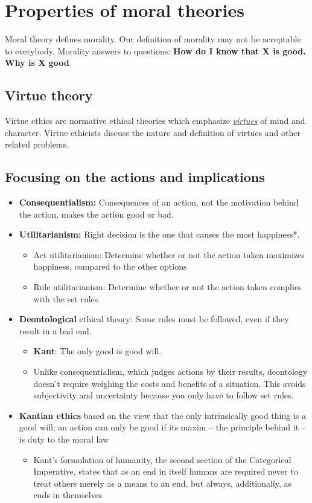 \documentclass{article}
\newcommand{\worddef}[1]{\hyperref[sec:reference]{\textit{#1}}}
\begin{document}
\section{Properties of moral theories}

\begin{flushleft}
Moral theory defines morality. Our definition of morality may not be acceptable to everybody.
Morality answers to questions: \textbf{How do I know that X is good. Why is X good}
\end{flushleft}

\subsection{Virtue theory}
Virtue ethics are normative ethical theories which emphasize \worddef{virtues} of mind and character. Virtue ethicists discuss the nature and definition of virtues and other related problems.

\subsection{Focusing on the actions and implications}
\begin{itemize}
  \item \textbf{Consequentialism:} Consequences of an action, not the motivation behind the action, makes the action good or bad.
  \item \textbf{Utilitarianism:} Right decision is the one that causes the most happiness*.
  \begin{itemize}
    \item Act utilitarianism: Determine whether or not the action taken maximizes happiness, compared to the other options
    \item Rule utilitarianism: Determine whether or not the action taken complies with the set rules
  \end{itemize}
  \item \textbf{Deontological} ethical theory: Some rules must be followed, even if they result in a bad end.
  \begin{itemize}
    \item \textbf{Kant}: The only good is good will. 
    \item Unlike consequentialism, which judges actions by their results, deontology doesn’t require weighing the costs and benefits of a situation. This avoids subjectivity and uncertainty because you only have to follow set rules.
  \end{itemize}
  \item \textbf{Kantian ethics} based on the view that the only intrinsically good thing is a good will; an action can only be good if its maxim – the principle behind it – is duty to the moral law
  \begin{itemize}
    \item Kant's formulation of humanity, the second section of the Categorical Imperative, states that as an end in itself humans are required never to treat others merely as a means to an end, but always, additionally, as ends in themselves
  \end{itemize}
\end{itemize}
\end{document}

